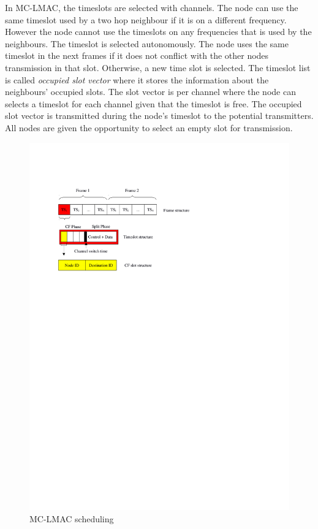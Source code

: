 In MC-LMAC, the timeslots are selected with channels. The node can use the same timeslot used by a two hop neighbour if it is on a different frequency. However the node cannot use the timeslots on any frequencies that is used by the neighbours. The timeslot is selected autonomously. The node uses the same timeslot in the next frames if it does not conflict with the other nodes transmission in that slot. Otherwise, a new time slot is selected. The timeslot list is called \textit{occupied slot vector} where it stores the information about the neighbours' occupied slots. The slot vector is per channel where the node can selects a timeslot for each channel given that the timeslot is free.
The occupied slot vector is transmitted during the node's timeslot to the potential transmitters. All nodes are given the opportunity to select an empty slot for transmission.

\begin{figure}
\centering
\includegraphics[trim=2cm 19cm 8cm 3cm, clip=true, totalheight=0.35\textheight]{mclmac.pdf}
\caption{MC-LMAC scheduling}
\label{fig_mclmac}
\end{figure}

